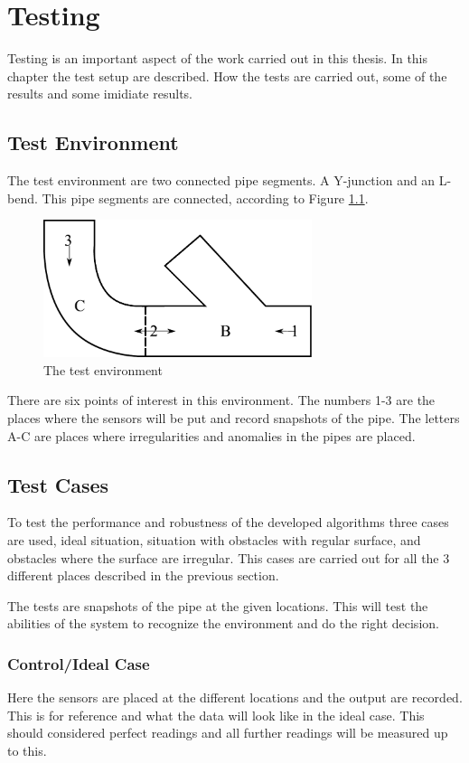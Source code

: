 \chapter{Testing}
Testing is an important aspect of the work carried out in this thesis. In this chapter the
test setup are described. How the tests are carried out, some of the results and some
imidiate results.


\section{Test Environment}
The test environment are two connected pipe segments. A Y-junction and an L-bend. This
pipe segments are connected, according to Figure \ref{chap7:fig-environment}.

\begin{figure}[htbp]
    \centering
    \includegraphics[width=0.7\textwidth]{pics/test-environment}
    \caption{The test environment}
    \label{chap7:fig-environment}
\end{figure}

There are six points of interest in this environment. 
The numbers 1-3 are the places where the sensors will be put and record snapshots of the pipe. 
The letters A-C are places where irregularities and anomalies in the pipes are placed. 


\section{Test Cases}
To test the performance and robustness of the developed algorithms three cases are used,
ideal situation, situation with obstacles with regular surface, and obstacles where the
surface are irregular. This cases are carried out for all the 3 different places described
in the previous section.

The tests are snapshots of the pipe at the given locations. This will test the abilities
of the system to recognize the environment and do the right decision. 


\subsection{Control/Ideal Case}
Here the sensors are placed at the different locations and the output are recorded. This
is for reference and what the data will look like in the ideal case. This should
considered perfect readings and all further readings will be measured up to this.


